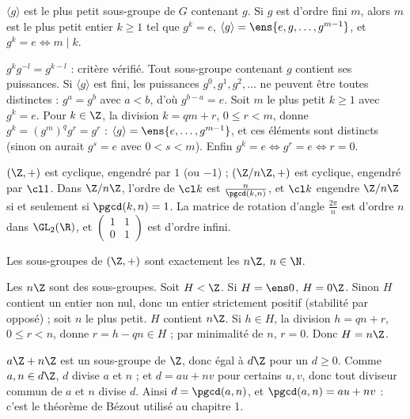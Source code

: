 \begin{proposition}\label{prop-engendre-g}
$\langle g\rangle$ est le plus petit sous-groupe de $G$ contenant $g$. Si $g$ est d'ordre fini $m$, alors $m$ est le plus petit entier $k\ge1$ tel que $g^k=e$, $\langle g\rangle=\ens{e,g,\dots,g^{m-1}}$, et $g^k=e\iff m\mid k$.
\end{proposition}
\begin{preuve}
$g^kg^{-l}=g^{k-l}$ : critère vérifié. Tout sous-groupe contenant $g$ contient ses puissances. Si $\langle g\rangle$ est fini, les puissances $g^0,g^1,g^2,\dots$ ne peuvent être toutes distinctes : $g^a=g^b$ avec $a<b$, d'où $g^{b-a}=e$. Soit $m$ le plus petit $k\ge1$ avec $g^k=e$. Pour $k\in\Z$, la division $k=qm+r$, $0\le r<m$, donne $g^k=(g^m)^qg^r=g^r$ : $\langle g\rangle=\ens{e,\dots,g^{m-1}}$, et ces éléments sont distincts (sinon on aurait $g^{s}=e$ avec $0<s<m$). Enfin $g^k=e\iff g^r=e\iff r=0$.
\end{preuve}
\begin{exemple}
$(\Z,+)$ est cyclique, engendré par $1$ (ou $-1$) ; $(\Z/n\Z,+)$ est cyclique, engendré par $\cl1$. Dans $\Z/n\Z$, l'ordre de $\cl k$ est $\frac n{\pgcd(k,n)}$, et $\cl k$ engendre $\Z/n\Z$ si et seulement si $\pgcd(k,n)=1$. La matrice de rotation d'angle $\frac{2\pi}n$ est d'ordre $n$ dans $\GL_2(\R)$, et $\begin{pmatrix}1&1\\0&1\end{pmatrix}$ est d'ordre infini.
\end{exemple}
\begin{theoreme}\label{thm-sg-Z}
Les sous-groupes de $(\Z,+)$ sont exactement les $n\Z$, $n\in\N$.
\end{theoreme}
\begin{preuve}
Les $n\Z$ sont des sous-groupes. Soit $H<\Z$. Si $H=\ens0$, $H=0\Z$. Sinon $H$ contient un entier non nul, donc un entier strictement positif (stabilité par opposé) ; soit $n$ le plus petit. $H$ contient $n\Z$. Si $h\in H$, la division $h=qn+r$, $0\le r<n$, donne $r=h-qn\in H$ ; par minimalité de $n$, $r=0$. Donc $H=n\Z$.
\end{preuve}
\begin{remarque}
$a\Z+n\Z$ est un sous-groupe de $\Z$, donc égal à $d\Z$ pour un $d\ge0$. Comme $a,n\in d\Z$, $d$ divise $a$ et $n$ ; et $d=au+nv$ pour certains $u,v$, donc tout diviseur commun de $a$ et $n$ divise $d$. Ainsi $d=\pgcd(a,n)$, et $\pgcd(a,n)=au+nv$ : c'est le théorème de Bézout utilisé au chapitre 1.
\end{remarque}
